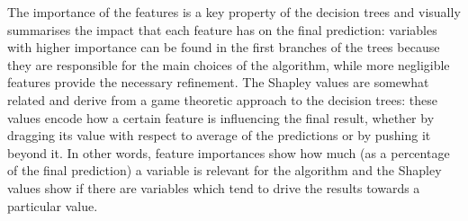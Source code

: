 The importance of the features is a key property of the decision trees and visually summarises the impact that each feature has on the final prediction: variables with higher importance can be found in the first branches of the trees because they are responsible for the main choices of the algorithm, while more negligible features provide the necessary refinement.
The Shapley values are somewhat related and derive from a game theoretic approach to the decision trees: these values encode how a certain feature is influencing the final result, whether by dragging its value with respect to average of the predictions or by pushing it beyond it.
In other words, feature importances show how much (as a percentage of the final prediction) a variable is relevant for the algorithm and the Shapley values show if there are variables which tend to drive the results towards a
particular value.

